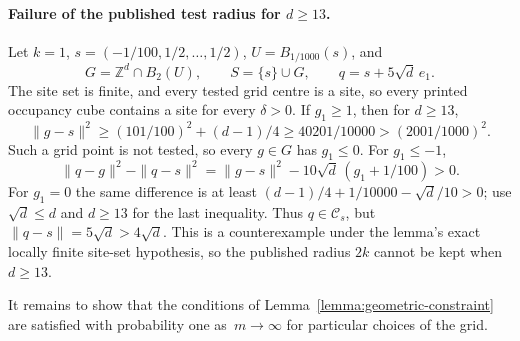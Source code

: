 \documentclass[12pt]{amsart}
\numberwithin{equation}{section}
\newcommand*{\Zd}{\ensuremath{\mathbb{Z}^d}}
\begin{document}
\paragraph{Failure of the published test radius for $d\ge13$.}
Let $k=1$, $s=(-1/100,1/2,\ldots,1/2)$, $U=B_{1/1000}(s)$, and
\[
 G=\Zd\cap B_2(U),\qquad S=\{s\}\cup G,\qquad q=s+5\sqrt d\,e_1.
\]
The site set is finite, and every tested grid centre is a site, so every printed occupancy cube contains a site for every $\delta>0$. If $g_1\ge1$, then for $d\ge13$,
\[
 \|g-s\|^2\ge(101/100)^2+(d-1)/4
 \ge40201/10000>(2001/1000)^2.
\]
Such a grid point is not tested, so every $g\in G$ has $g_1\le0$. For $g_1\le-1$,
\[
 \|q-g\|^2-\|q-s\|^2
 =\|g-s\|^2-10\sqrt d\,(g_1+1/100)>0.
\]
For $g_1=0$ the same difference is at least
$(d-1)/4+1/10000-\sqrt d/10>0$; use $\sqrt d\le d$ and $d\ge13$ for the last inequality. Thus $q\in\mathcal C_s$, but $\|q-s\|=5\sqrt d>4\sqrt d$. This is a counterexample under the lemma's exact locally finite site-set hypothesis, so the published radius $2k$ cannot be kept when $d\ge13$.


It remains to show that the conditions of Lemma~\ref{lemma:geometric-constraint} are satisfied with probability one  as~$m \to \infty$
for particular choices of the grid. 
\end{document}
